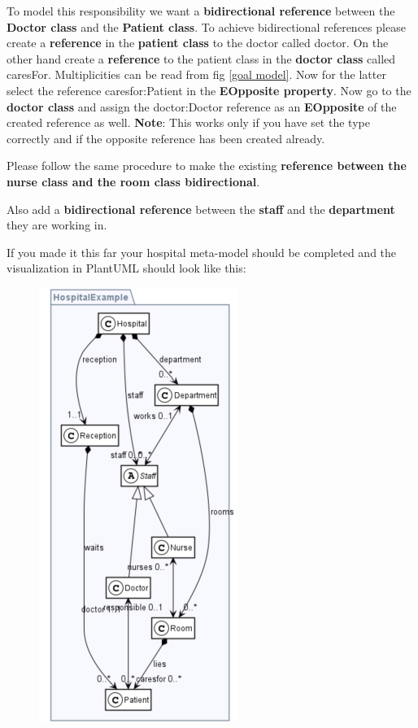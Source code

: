 To model this responsibility we want a \textbf{bidirectional reference} between the \textbf{Doctor class} and the \textbf{Patient class}.
To achieve bidirectional references please create a \textbf{reference} in the \textbf{patient class} to the doctor called \textsf{doctor}. On the other hand create a \textbf{reference} to the patient class in the \textbf{doctor class} called \textsf{caresFor}. Multiplicities can be read from fig \ref{goal model}.
Now for the latter select the reference \textsf{caresfor:Patient} in the \textbf{EOpposite property}. Now go to the \textbf{doctor class} and assign the \textsf{doctor:Doctor} reference as an \textbf{EOpposite} of the created reference as well.\newline
\textbf{Note}: This works only if you have set the type correctly and if the opposite reference has been created already.\newline

Please follow the same procedure to make the existing \textbf{reference between the nurse class and the room class bidirectional}.\newline

Also add a \textbf{bidirectional reference} between the \textbf{staff} and the \textbf{department} they are \textsf{working} in.\newline

If you made it this far your hospital meta-model should be completed and the visualization in PlantUML should look like this:

\begin{figure}[h]
    \centering
    \includegraphics[scale=0.7]{pictures/goal_vis_PlantUML.png}
    \caption{}
    \label{plantUml goal}
\end{figure}

